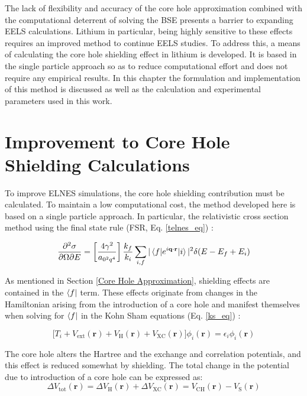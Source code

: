 




The lack of flexibility and accuracy of the core hole approximation combined with the computational deterrent of solving the BSE presents a barrier to expanding EELS calculations.  Lithium in particular, being highly sensitive to these effects requires an improved method to continue EELS studies.  To address this, a means of calculating the core hole shielding effect in lithium is developed.  It is based in the single particle approach so as to reduce computational effort and does not require any empirical results.  In this chapter the formulation and implementation of this method is discussed as well as the calculation and experimental parameters used in this work. 


\section{Improvement to Core Hole Shielding Calculations}
To improve ELNES simulations, the core hole shielding contribution must be calculated.   To maintain a low computational cost, the method developed here is based on a single particle approach.  In particular, the relativistic cross section method using the final state rule (FSR, Eq. \ref{telnes_eq}) \cite{jorissen2007ab}:

\begin{equation}
	\frac{\partial^2 \sigma}{\partial \Omega \partial E} = \left[\frac{4\gamma^2}{a_{\mathrm{0}^2q^4}}\right] \frac{k_f}{k_i} \sum_{i,f}|\mel{f}{e^{i\textbf{q}\cdot\textbf{r}}}{i}|^2\delta(E-E_f+E_i)
\end{equation}

As mentioned in Section \ref{Core Hole Approximation}, shielding effects are contained in the $\bra{f}$ term. These effects originate from changes in the Hamiltonian arising from the introduction of a core hole and manifest themselves when solving for $\bra{f}$ in the Kohn Sham equations (Eq. \ref{ks_eq}) \cite{kohn_self-consistent_1965}:  

\begin{equation}
    \bigg[T_i + V_{\mathrm{ext}}(\textbf{r}) + V_{\mathrm{H}}(\textbf{r}) + V_{\mathrm{XC}}(\textbf{r})\bigg] \phi_i(\textbf{r}) = \epsilon_i \phi_i(\textbf{r})
\end{equation}

The core hole alters the Hartree and the exchange and correlation potentials, and this effect is reduced somewhat by shielding.  The total change in the potential due to introduction of a core hole can be expressed as: 
\begin{equation}
\Delta V_{\mathrm{tot}}(\textbf{r})=\Delta V_{\mathrm{H}}(\textbf{r}) +\Delta V_{\mathrm{XC}}(\textbf{r})=V_{\mathrm{CH}}(\textbf{r}) - V_{\mathrm{S}}(\textbf{r})
\label{delta_potentials}
\end{equation}

